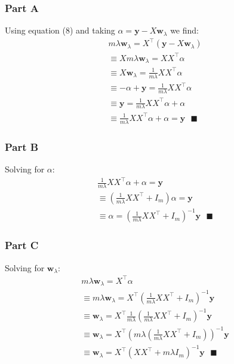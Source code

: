 \documentclass[11pt, oneside]{article}   	%
\begin{document}
\subsubsection{Part A}
Using equation (8) and taking $\alpha = \boldsymbol{y} - X\boldsymbol{w}_\lambda$ we find:
\begin{gather*}
m\lambda \boldsymbol{w}_\lambda = X^\top (\boldsymbol{y} - X\boldsymbol{w}_\lambda)\\
\equiv Xm\lambda \boldsymbol{w}_\lambda = XX^\top \alpha\\
\equiv X\boldsymbol{w}_\lambda = \frac{1}{m\lambda}XX^\top \alpha\\
\equiv -\alpha + \boldsymbol{y}= \frac{1}{m\lambda}XX^\top \alpha\\
\equiv \boldsymbol{y}= \frac{1}{m\lambda}XX^\top \alpha + \alpha\\
\equiv \frac{1}{m\lambda}XX^\top \alpha + \alpha = \boldsymbol{y} \text{ } \blacksquare
\end{gather*}

\subsubsection{Part B}
Solving for $\alpha$:
\begin{gather*}
\frac{1}{m\lambda}XX^\top \alpha + \alpha = \boldsymbol{y}\\
\equiv (\frac{1}{m\lambda}XX^\top + I_m) \alpha = \boldsymbol{y}\\
\equiv \alpha = (\frac{1}{m\lambda}XX^\top + I_m)^{-1} \boldsymbol{y} \text{ } \blacksquare
\end{gather*}

\subsubsection{Part C}
Solving for $\boldsymbol{w}_\lambda$:
\begin{gather*}
m\lambda \boldsymbol{w}_\lambda = X^\top \alpha\\
\equiv m\lambda \boldsymbol{w}_\lambda = X^\top (\frac{1}{m\lambda}XX^\top + I_m)^{-1} \boldsymbol{y}\\
\equiv \boldsymbol{w}_\lambda = X^\top \frac{1}{m\lambda} (\frac{1}{m\lambda}XX^\top + I_m)^{-1} \boldsymbol{y}\\
\equiv \boldsymbol{w}_\lambda = X^\top (m\lambda(\frac{1}{m\lambda}XX^\top + I_m))^{-1} \boldsymbol{y}\\
\equiv \boldsymbol{w}_\lambda = X^\top (XX^\top + m\lambda I_m)^{-1} \boldsymbol{y} \text{ } \blacksquare
\end{gather*}
\end{document}
